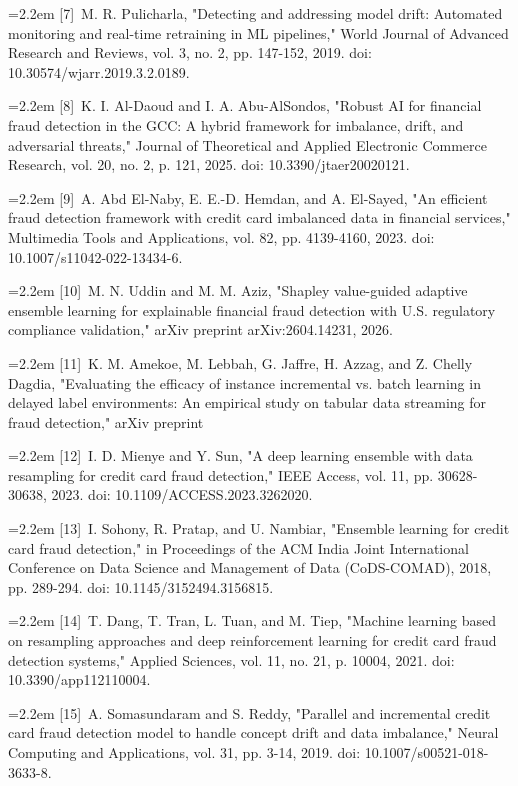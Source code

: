 \documentclass[11pt,letterpaper]{report}
\newcommand{\bibentry}[2]{\par\hangindent=2.2em\hangafter=1 [#1]\ #2\par}
\begin{document}
\bibentry{7}{M. R. Pulicharla, "Detecting and addressing model drift: Automated monitoring and real-time retraining in ML pipelines," World Journal of Advanced Research and Reviews, vol. 3, no. 2, pp. 147-152, 2019. doi: 10.30574/wjarr.2019.3.2.0189.}

\bibentry{8}{K. I. Al-Daoud and I. A. Abu-AlSondos, "Robust AI for financial fraud detection in the GCC: A hybrid framework for imbalance, drift, and adversarial threats," Journal of Theoretical and Applied Electronic Commerce Research, vol. 20, no. 2, p. 121, 2025. doi: 10.3390/jtaer20020121.}

\bibentry{9}{A. Abd El-Naby, E. E.-D. Hemdan, and A. El-Sayed, "An efficient fraud detection framework with credit card imbalanced data in financial services," Multimedia Tools and Applications, vol. 82, pp. 4139-4160, 2023. doi: 10.1007/s11042-022-13434-6.}

\bibentry{10}{M. N. Uddin and M. M. Aziz, "Shapley value-guided adaptive ensemble learning for explainable financial fraud detection with U.S. regulatory compliance validation," arXiv preprint arXiv:2604.14231, 2026.}

\bibentry{11}{K. M. Amekoe, M. Lebbah, G. Jaffre, H. Azzag, and Z. Chelly Dagdia, "Evaluating the efficacy of instance incremental vs. batch learning in delayed label environments: An empirical study on tabular data streaming for fraud detection," arXiv preprint}

\bibentry{12}{I. D. Mienye and Y. Sun, "A deep learning ensemble with data resampling for credit card fraud detection," IEEE Access, vol. 11, pp. 30628-30638, 2023. doi: 10.1109/ACCESS.2023.3262020.}

\bibentry{13}{I. Sohony, R. Pratap, and U. Nambiar, "Ensemble learning for credit card fraud detection," in Proceedings of the ACM India Joint International Conference on Data Science and Management of Data (CoDS-COMAD), 2018, pp. 289-294. doi: 10.1145/3152494.3156815.}

\bibentry{14}{T. Dang, T. Tran, L. Tuan, and M. Tiep, "Machine learning based on resampling approaches and deep reinforcement learning for credit card fraud detection systems," Applied Sciences, vol. 11, no. 21, p. 10004, 2021. doi: 10.3390/app112110004.}

\bibentry{15}{A. Somasundaram and S. Reddy, "Parallel and incremental credit card fraud detection model to handle concept drift and data imbalance," Neural Computing and Applications, vol. 31, pp. 3-14, 2019. doi: 10.1007/s00521-018-3633-8.}
\end{document}
